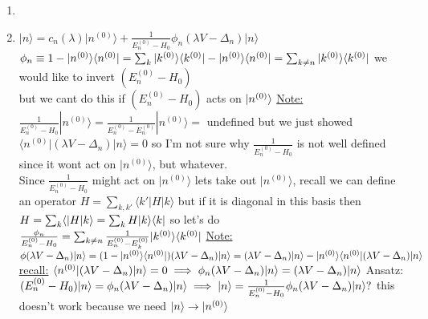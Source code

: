 \documentclass[12pt]{amsart}
\begin{document}
\begin{enumerate}
\item \item \underline{$| n \rangle = c_n( \lambda) | n^{(0)} \rangle + \frac{1}{E_n^{(0)} - H_0} \phi_n ( \lambda V - \Delta_n) | n \rangle$}\\
$\phi_n \equiv 1- | n^{(0)} \rangle \langle n^{(0)}| = \sum_{k} | k^{(0)} \rangle \langle k^{(0)} | - | n^{(0)} \rangle \langle n^{(0)}|\\
= \sum_{k \neq n} | k^{(0)} \rangle \langle k^{(0)}|\\$
we would like to invert $(E_n^{(0)} - H_0)$\\
but we cant do this if $(E_n^{(0)} - H_0)$ acts on $| n^{(0)} \rangle\\$
\underline{Note:} $\frac{1}{E_n^{(0)} - H_0} | n^{(0)} \rangle = \frac{1}{E_n^{(0)} - E_n^{(0)}} | n^{(0)} \rangle =$ undefined
but we just showed $\langle n^{(0)} | ( \lambda V - \Delta_n) | n \rangle = 0$ so I'm not sure why  $\frac{1}{E_n^{(0)} - H_0}$ is not well defined since it wont act on $| n^{(0)} \rangle$, but whatever.\\
Since $\frac{1}{E_n^{(0)} - H_0}$ might act on $| n^{(0)} \rangle$ lets take out $| n^{(0)} \rangle$, recall we can define an operator $H = \sum_{k, k'} \langle k' | H | k \rangle$ but if it is diagonal in this basis then $H= \sum_k \langle | H | k \rangle = \sum_k H | k \rangle \langle k |\\$
so let's do\\
$\frac{\phi_n}{E_n^{(0)} - H_0} = \sum_{k \neq n} \frac{1}{E_n^{(0)} - E_k^{(0)}} | k^{(0)} \rangle \langle k^{(0)} |\\$
\underline{Note:} $\phi ( \lambda V - \Delta_n) | n \rangle = ( 1- | n^{(0)} \rangle \langle n^{(0)} | ) ( \lambda V - \Delta_n) | n \rangle\\
= ( \lambda V - \Delta_n) | n \rangle - | n^{(0) } \rangle \langle n^{(0)} | ( \lambda V - \Delta_n) | n \rangle\\$
\underline{recall:} $\langle n^{(0)} | ( \lambda V - \Delta_n) | n \rangle = 0\\
\implies \phi_n ( \lambda V - \Delta_n) | n \rangle = ( \lambda V - \Delta_n) | n \rangle\\$
Ansatz: $(E_n^{(0)} - H_0) | n \rangle = \phi_n ( \lambda V - \Delta_n) | n \rangle\\
\implies | n \rangle = \frac{1}{E_n^{(0)} - H_0} \phi_n ( \lambda V - \Delta_n) | n \rangle ?\\$
this doesn't work because we need $| n \rangle \rightarrow | n^{(0)} \rangle\\$

\end{enumerate}
\end{document}
